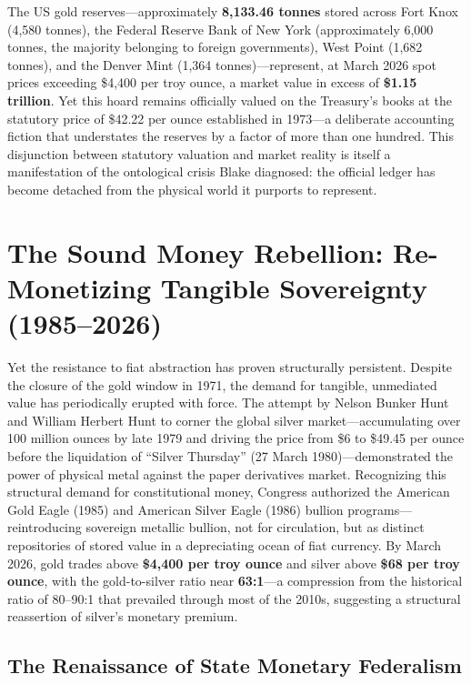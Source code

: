 \documentclass[
]{article}
\begin{document}
The US gold reserves---approximately \textbf{8,133.46 tonnes} stored
across Fort Knox (4,580 tonnes), the Federal Reserve Bank of New York
(approximately 6,000 tonnes, the majority belonging to foreign
governments), West Point (1,682 tonnes), and the Denver Mint (1,364
tonnes)---represent, at March 2026 spot prices exceeding \$4,400 per
troy ounce, a market value in excess of \textbf{\$1.15 trillion}. Yet
this hoard remains officially valued on the Treasury's books at the
statutory price of \$42.22 per ounce established in 1973---a deliberate
accounting fiction that understates the reserves by a factor of more
than one hundred. This disjunction between statutory valuation and
market reality is itself a manifestation of the ontological crisis Blake
diagnosed: the official ledger has become detached from the physical
world it purports to represent.

\newpage

\section{The Sound Money Rebellion: Re-Monetizing Tangible Sovereignty
(1985--2026)}\label{the-sound-money-rebellion-re-monetizing-tangible-sovereignty-19852026}

Yet the resistance to fiat abstraction has proven structurally
persistent. Despite the closure of the gold window in 1971, the demand
for tangible, unmediated value has periodically erupted with force. The
attempt by Nelson Bunker Hunt and William Herbert Hunt to corner the
global silver market---accumulating over 100 million ounces by late 1979
and driving the price from \$6 to \$49.45 per ounce before the
liquidation of ``Silver Thursday'' (27 March 1980)---demonstrated the
power of physical metal against the paper derivatives market.
Recognizing this structural demand for constitutional money, Congress
authorized the American Gold Eagle (1985) and American Silver Eagle
(1986) bullion programs---reintroducing sovereign metallic bullion, not
for circulation, but as distinct repositories of stored value in a
depreciating ocean of fiat currency. By March 2026, gold trades above
\textbf{\$4,400 per troy ounce} and silver above \textbf{\$68 per troy
ounce}, with the gold-to-silver ratio near \textbf{63:1}---a compression
from the historical ratio of 80--90:1 that prevailed through most of the
2010s, suggesting a structural reassertion of silver's monetary premium.

\subsection{The Renaissance of State Monetary
Federalism}\label{the-renaissance-of-state-monetary-federalism}
\end{document}
